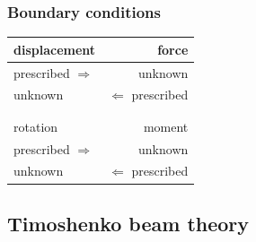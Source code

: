 \begin{frame}
  \frametitle{Boundary conditions}
  
  \vspace{4em}
  \begin{center}
    \begin{tabular}{lr}
      displacement & force \\
      \hline
      prescribed $\Rightarrow$ & unknown \\
      unknown & $\Leftarrow$ prescribed \\
      \hline \\
      \\
      rotation & moment \\
      \hline
      prescribed $\Rightarrow$ & unknown \\
      unknown & $\Leftarrow$ prescribed \\
      \hline
    \end{tabular}
  \end{center}
\end{frame}


\subsection{Timoshenko beam theory}


